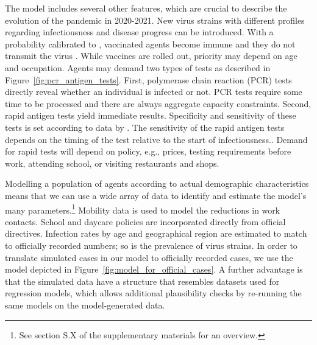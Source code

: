The model includes several other features, which are crucial to describe the evolution of
the pandemic in 2020-2021. New virus strains with different profiles regarding
infectiousness and disease progress can be introduced. With a probability calibrated to
\cite{Hunter2021}, vaccinated agents become immune and they do not
transmit the virus \citep{Petter2021, LevineTiefenbrun2021, Pritchard2021}.
While vaccines are rolled out, priority may depend on age and occupation. Agents may
demand two types of tests as described in Figure~\ref{fig:pcr_antigen_tests}. First,
polymerase chain reaction (PCR) tests directly reveal whether an individual is infected
or not. PCR tests require some time to be processed and there are always aggregate
capacity constraints. Second, rapid antigen tests yield immediate results. Specificity
and sensitivity of these tests is set according to data by \cite{Bruemmer2021, Smith2021}
. The sensitivity of the rapid antigen tests depends on the timing of the test relative
to the start of infectiousness.. Demand for rapid tests will depend on policy, e.g., prices, testing
requirements before work, attending school, or visiting restaurants and shops.

Modelling a population of agents according to actual demographic characteristics means
that we can use a wide array of data to identify and estimate the model's many
parameters.\footnote{See section S.X of the supplementary materials for an
overview.} Mobility data is used to
model the reductions in work contacts. School and daycare policies are incorporated
directly from official directives. Infection rates by age and geographical region are
estimated to match to officially recorded numbers; so is the prevalence of virus strains.
In order to translate simulated cases in our model to officially recorded cases, we use
the model depicted in Figure~\ref{fig:model_for_official_cases}.  A further advantage is that the simulated data have a structure that resembles
datasets used for regression models, which allows additional plausibility checks by
re-running the same models on the model-generated data.

